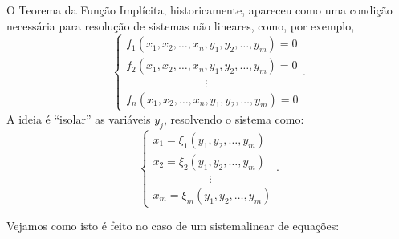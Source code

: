 O Teorema da Função Implícita, historicamente, apareceu como uma condição necessária para resolução de sistemas não lineares, como, por exemplo,
\[
\begin{cases}
f_1 (x_1, x_2, \dots, x_n, y_1, y_2, \dots, y_m) = 0 \\
f_2 (x_1, x_2, \dots, x_n, y_1, y_2, \dots, y_m) = 0 \\
\qquad \qquad \qquad \quad \vdots \\
f_n (x_1, x_2, \dots, x_n, y_1, y_2, \dots, y_m) = 0
\end{cases}.
\] A ideia é ``isolar'' as variáveis $y_j$, resolvendo o sistema como:
\[
\begin{cases}
x_1 = \xi_1 (y_1, y_2, \dots, y_m) \\
x_2 = \xi_2 (y_1, y_2, \dots, y_m) \\
\qquad \qquad \quad \vdots \\
x_m = \xi_m (y_1, y_2, \dots, y_m)
\end{cases}.
\] 

Vejamos como isto é feito no caso de um sistemalinear de equações:

